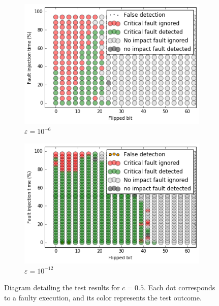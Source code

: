 \begin{figure}[h]
\begin{minipage}[b]{0.48\linewidth}
	\begin{subfigure}[t]{\linewidth}
		\centering
		\includegraphics[width=1.1\linewidth]{figures/pores_2/test_result_c05_0.png}
		\caption{$\varepsilon = 10^{-6}$}\label{fig:pores_2_test_result_c05_0}	
	\end{subfigure}
    \quad
    \begin{subfigure}[t]{\linewidth}
		\centering
		\includegraphics[width=1.1\linewidth]{figures/pores_2/test_result_c05_1.png}
		\caption{$\varepsilon = 10^{-12}$}\label{fig:pores_2_test_result_c05_1}	
	\end{subfigure}

	\end{minipage}
\caption{Diagram detailing the test results for $c = 0.5$. Each dot corresponds to a faulty execution, and its color represents the test outcome.}
\label{fig:test_result_c05}
\end{figure}



